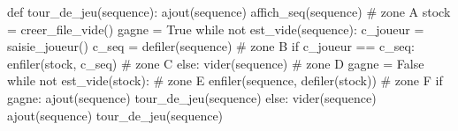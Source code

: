 \documentclass[
  letterpaper,
  DIV=11,
  numbers=noendperiod]{scrartcl}
\newenvironment{Shaded}{\begin{snugshade}}{\end{snugshade}}
\newcommand{\CommentTok}[1]{\textcolor[rgb]{0.37,0.37,0.37}{#1}}
\newcommand{\ControlFlowTok}[1]{\textcolor[rgb]{0.00,0.23,0.31}{#1}}
\newcommand{\KeywordTok}[1]{\textcolor[rgb]{0.00,0.23,0.31}{#1}}
\newcommand{\NormalTok}[1]{\textcolor[rgb]{0.00,0.23,0.31}{#1}}
\newcommand{\OperatorTok}[1]{\textcolor[rgb]{0.37,0.37,0.37}{#1}}
\newcommand{\VariableTok}[1]{\textcolor[rgb]{0.07,0.07,0.07}{#1}}
\begin{document}
\begin{Shaded}
\begin{Highlighting}[]
\KeywordTok{def}\NormalTok{ tour\_de\_jeu(sequence):}
\NormalTok{    ajout(sequence)}
\NormalTok{    affich\_seq(sequence) }\CommentTok{\# zone A}
\NormalTok{    stock }\OperatorTok{=}\NormalTok{ creer\_file\_vide()}
\NormalTok{    gagne }\OperatorTok{=} \VariableTok{True}
    \ControlFlowTok{while} \KeywordTok{not}\NormalTok{ est\_vide(sequence):}
\NormalTok{        c\_joueur }\OperatorTok{=}\NormalTok{ saisie\_joueur()}
\NormalTok{        c\_seq }\OperatorTok{=}\NormalTok{ defiler(sequence) }\CommentTok{\# zone B}
        \ControlFlowTok{if}\NormalTok{ c\_joueur }\OperatorTok{==}\NormalTok{ c\_seq:}
\NormalTok{            enfiler(stock, c\_seq) }\CommentTok{\# zone C}
        \ControlFlowTok{else}\NormalTok{:}
\NormalTok{            vider(sequence) }\CommentTok{\# zone D}
\NormalTok{            gagne }\OperatorTok{=} \VariableTok{False}
    \ControlFlowTok{while} \KeywordTok{not}\NormalTok{ est\_vide(stock): }\CommentTok{\# zone E}
\NormalTok{        enfiler(sequence, defiler(stock)) }\CommentTok{\# zone F}
    \ControlFlowTok{if}\NormalTok{ gagne:}
\NormalTok{        ajout(sequence)}
\NormalTok{        tour\_de\_jeu(sequence)}
    \ControlFlowTok{else}\NormalTok{:}
\NormalTok{        vider(sequence)}
\NormalTok{        ajout(sequence)}
\NormalTok{        tour\_de\_jeu(sequence)}
\end{Highlighting}
\end{Shaded}
\end{document}
